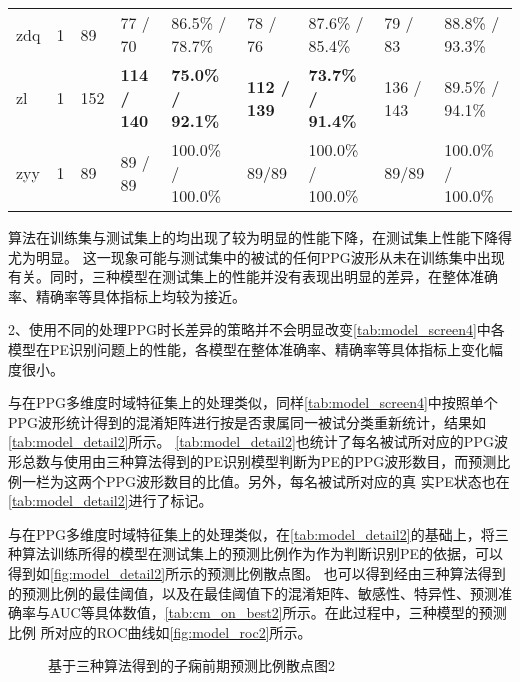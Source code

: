 \begin{center}
\begin{longtable}{m{1cm}<{\centering}m{1cm}<{\centering}m{1cm}<{\centering}m{1.5cm}<{\centering}m{2cm}<{\centering}m{1.5cm}<{\centering}m{2cm}<{\centering}m{1.5cm}<{\centering}m{2cm}<{\centering}}
             zdq       & 1           & 89                    & 77 / 70         & 86.5\% / 78.7\%     & 78 / 76         & 87.6\% / 85.4\%     & 79 / 83         & 88.8\% / 93.3\%                                       \\
             zl        & 1           & 152                   & \textbf{114 / 140}        & \textbf{75.0\% / 92.1\%}     & \textbf{112 / 139}         & \textbf{73.7\% / 91.4\%}     & 136 / 143        & 89.5\% / 94.1\%                                    \\
             zyy       & 1           & 89                    & 89 / 89         & 100.0\% / 100.0\%    & 89/89         & 100.0\% / 100.0\%    & 89/89         & 100.0\% / 100.0\%                                     \\    
      \end{longtable}
\end{center}
\noindent
算法在训练集与测试集上的均出现了较为明显的性能下降，在测试集上性能下降得尤为明显。
这一现象可能与测试集中的被试的任何PPG波形从未在训练集中出现有关。同时，三种模型在测试集上的性能并没有表现出明显的差异，在整体准确率、精确率等具体指标上均较为接近。

2、使用不同的处理PPG时长差异的策略并不会明显改变\autoref{tab:model_screen4}中各模型在PE识别问题上的性能，各模型在整体准确率、精确率等具体指标上变化幅度很小。

与在PPG多维度时域特征集上的处理类似，同样\autoref{tab:model_screen4}中按照单个PPG波形统计得到的混淆矩阵进行按是否隶属同一被试分类重新统计，结果如\autoref{tab:model_detail2}所示。
\autoref{tab:model_detail2}也统计了每名被试所对应的PPG波形总数与使用由三种算法得到的PE识别模型判断为PE的PPG波形数目，而预测比例一栏为这两个PPG波形数目的比值。另外，每名被试所对应的真
实PE状态也在\autoref{tab:model_detail2}进行了标记。

与在PPG多维度时域特征集上的处理类似，在\autoref{tab:model_detail2}的基础上，将三种算法训练所得的模型在测试集上的预测比例作为作为判断识别PE的依据，可以得到如\autoref{fig:model_detail2}所示的预测比例散点图。
也可以得到经由三种算法得到的预测比例的最佳阈值，以及在最佳阈值下的混淆矩阵、敏感性、特异性、预测准确率与AUC等具体数值，\autoref{tab:cm_on_best2}所示。在此过程中，三种模型的预测比例
所对应的ROC曲线如\autoref{fig:model_roc2}所示。
\begin{figure}[htbp]
      \centering
      \quad
      \caption{\label{fig:model_detail2}基于三种算法得到的子痫前期预测比例散点图2}
\end{figure}

